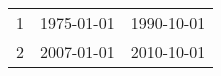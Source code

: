 % 
\begin{tabular}{ccc}
  \hline
  \hline
1 & 1975-01-01 & 1990-10-01 \\ 
  2 & 2007-01-01 & 2010-10-01 \\ 
   \hline
\end{tabular}
